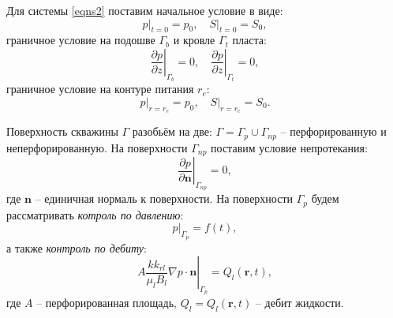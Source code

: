 	Для системы \eqref{eqns2} поставим начальное условие в виде:
\begin{equation}
	\label{init_cond}
	\left.p\right|_{t=0} = p_0, \quad \left.S\right|_{t=0} = S_0,
\end{equation}
	граничное условие на подошве $\Gamma_b$ и кровле $\Gamma_t$ пласта:
\begin{equation}
	\label{well_cond4}
	\left.\frac{\partial p}{\partial z}\right|_{\Gamma_{b}} = 0,\quad
	\left.\frac{\partial p}{\partial z}\right|_{\Gamma_{t}} = 0,
\end{equation}
	граничное условие на контуре питания $r_e$:
\begin{equation}
	\label{contour_cond}
	\left.p\right|_{r=r_e} = p_0, \quad \left.S\right|_{r=r_e} = S_0.
\end{equation}
	
	Поверхность скважины $\Gamma$ разобьём на две: $\Gamma = \Gamma_p \cup \Gamma_{np}$ -- перфорированную и неперфорированную.
	На поверхности $\Gamma_{np}$ поставим условие непротекания:
\begin{equation}
	\label{well_cond1}
	\left.\frac{\partial p}{\partial \boldsymbol{n}}\right|_{\Gamma_{np}} = 0,
\end{equation}
	где $\boldsymbol{n}$ -- единичная нормаль к поверхности.
	На поверхности $\Gamma_p$ будем рассматривать \textit{котроль по давлению}:
\begin{equation}
	\label{well_cond2}
	\left.p\right|_{\Gamma_{p}} = f(t),
\end{equation}	
	а также \textit{контроль по дебиту}:
\begin{equation}
	\label{well_cond3}
	\left.A\frac{kk_{rl}}{\mu_l B_l}\nabla p \cdot \boldsymbol{n}\right|_{\Gamma_{p}} = Q_l(\boldsymbol{r}, t),
\end{equation}	
	где $A$ -- перфорированная площадь,
	$Q_l = Q_l(\boldsymbol{r}, t)$ -- дебит жидкости.

